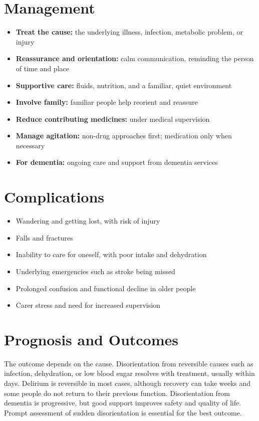 \section*{Management}
\begin{itemize}
    \item \textbf{Treat the cause:} the underlying illness, infection, metabolic problem, or injury
    \item \textbf{Reassurance and orientation:} calm communication, reminding the person of time and place
    \item \textbf{Supportive care:} fluids, nutrition, and a familiar, quiet environment
    \item \textbf{Involve family:} familiar people help reorient and reassure
    \item \textbf{Reduce contributing medicines:} under medical supervision
    \item \textbf{Manage agitation:} non-drug approaches first; medication only when necessary
    \item \textbf{For dementia:} ongoing care and support from dementia services
\end{itemize}

\section*{Complications}
\begin{itemize}
    \item Wandering and getting lost, with risk of injury
    \item Falls and fractures
    \item Inability to care for oneself, with poor intake and dehydration
    \item Underlying emergencies such as stroke being missed
    \item Prolonged confusion and functional decline in older people
    \item Carer stress and need for increased supervision
\end{itemize}

\section*{Prognosis and Outcomes}
The outcome depends on the cause. Disorientation from reversible causes such as infection, dehydration, or low blood sugar resolves with treatment, usually within days. Delirium is reversible in most cases, although recovery can take weeks and some people do not return to their previous function. Disorientation from dementia is progressive, but good support improves safety and quality of life. Prompt assessment of sudden disorientation is essential for the best outcome.

